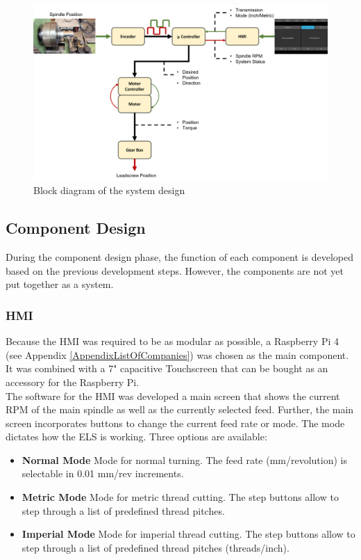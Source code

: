 \begin{figure}
    \begin{center}
    \includegraphics[width=12cm]{Pictures/SystemDesign.png}
    \caption[Block diagram of the system design]{Block diagram of the system design}
    \label{System design}
    \end{center}
\end{figure}
 
 
\subsection{Component Design}
During the component design phase, the function of each component is developed based on the previous development steps. However, the components are not yet put together as a system.
 
\subsubsection{HMI}
Because the HMI was required to be as modular as possible, a Raspberry Pi 4 (see Appendix \ref{AppendixListOfCompanies}) was chosen as the main component. It was combined with a 7" capacitive Touchscreen that can be bought as an accessory for the Raspberry Pi.\\
The software for the HMI was developed a main screen that shows the current RPM of the main spindle as well as the currently selected feed. Further, the main screen incorporates buttons to change the current feed rate or mode. The mode dictates how the ELS is working. Three options are available:
 
\begin{itemize}
    \item \textbf{Normal Mode} Mode for normal turning. The feed rate (mm/revolution) is selectable in 0.01 mm/rev increments.
    \item \textbf{Metric Mode} Mode for metric thread cutting. The step buttons allow to step through a list of predefined thread pitches.
    \item \textbf{Imperial Mode} Mode for imperial thread cutting. The step buttons allow to step through a list of predefined thread pitches (threads/inch).
\end{itemize}
 
